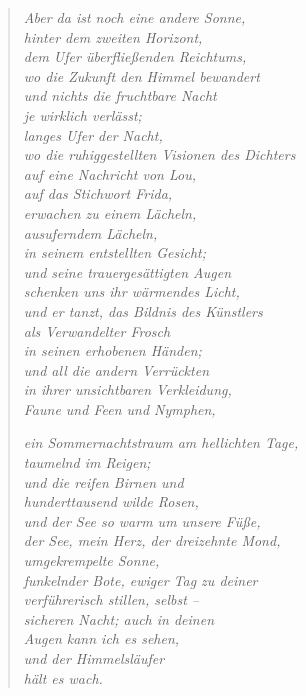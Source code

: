 \begin{verse}
\itshape
Aber da ist noch eine andere Sonne,\\
hinter dem zweiten Horizont,\\
dem Ufer überfließenden Reichtums,\\
wo die Zukunft den Himmel bewandert\\
und nichts die fruchtbare Nacht\\
je wirklich verlässt;\\
langes Ufer der Nacht,\\
wo die ruhiggestellten Visionen des Dichters\\
auf eine Nachricht von Lou,\\
auf das Stichwort {\upshape Frida},\\
erwachen zu einem Lächeln,\\
ausuferndem Lächeln,\\
in seinem entstellten Gesicht;\\
und seine trauergesättigten Augen\\
schenken uns ihr wärmendes Licht,\\
und er tanzt, das {\upshape Bildnis des Künstlers\\
als Verwandelter Frosch}\\
in seinen erhobenen Händen;\\
und all die andern Verrückten\\
in ihrer unsichtbaren Verkleidung,\\
Faune und Feen und Nymphen,

\clearpage

{\itshape
ein {\upshape Sommernachtstraum} am hellichten Tage,\\
taumelnd im Reigen;\\
und die reifen Birnen und\\
hunderttausend wilde Rosen,\\
und der See so warm um unsere Füße,\\
der See, mein Herz, der dreizehnte Mond,\\
umgekrempelte Sonne,\\
funkelnder Bote, ewiger Tag zu deiner\\
verführerisch stillen, selbst --\\
sicheren Nacht; auch in deinen\\
Augen kann ich es sehen,\\
und der Himmelsläufer\\
hält es wach.}


\end{verse}
